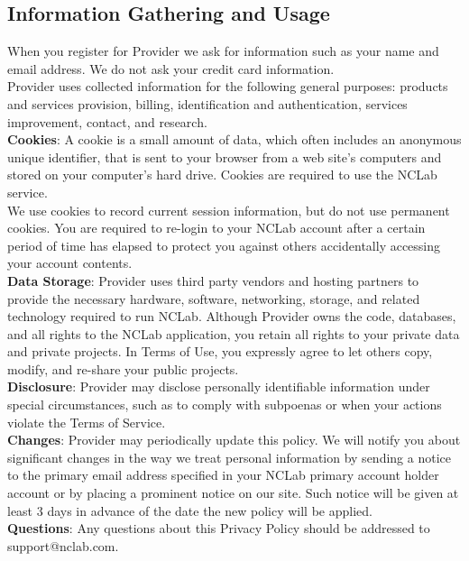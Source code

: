 \documentclass{article}
\begin{document}
\subsection*{Information Gathering and Usage}

When you register for Provider we ask for information such as your name and email address. We do not ask your 
credit card information. \\

\noindent
Provider uses collected information for the following general purposes: products and services provision, billing, identification and authentication, services improvement, contact, and research.\\

\noindent
{\bf Cookies}: A cookie is a small amount of data, which often includes an anonymous unique identifier, that is sent to your browser from a web site’s computers and stored on your computer’s hard drive. Cookies are required to use the NCLab service.\\

\noindent
We use cookies to record current session information, but do not use permanent cookies. You are required to re-login to your NCLab account after a certain period of time has elapsed to protect you against others accidentally accessing your account contents.\\


\noindent
{\bf Data Storage}: Provider uses third party vendors and hosting partners to provide the necessary 
hardware, software, networking, storage, and related technology required to run NCLab. Although 
Provider owns the code, databases, and all rights to the NCLab application, you retain all rights 
to your private data and private projects. In Terms of Use, you expressly agree to let others copy, modify,
and re-share your public projects.\\


\noindent
{\bf Disclosure}: Provider may disclose personally identifiable information under special circumstances, 
such as to comply with subpoenas or when your actions violate the Terms of Service.\\


\noindent
{\bf Changes}: Provider may periodically update this policy. We will notify you about significant 
changes in the way we treat personal information by sending a notice to the primary email address 
specified in your NCLab primary account holder account or by placing a prominent notice on our 
site. Such notice will be given at least 3 days in advance of the date the new policy will be 
applied.\\

\noindent
{\bf Questions}: Any questions about this Privacy Policy should be addressed to support@nclab.com.
\end{document}
